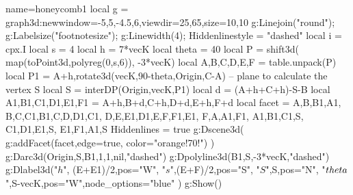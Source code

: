 \documentclass[12pt]{standalone}
\begin{document}
\begin{luadraw}{name=honeycomb1}
local g = graph3d:new{window={-5,5,-4.5,6},viewdir={25,65},size={10,10}}
g:Linejoin("round"); g:Labelsize("footnotesize"); g:Linewidth(4); Hiddenlinestyle = "dashed"
local i = cpx.I
local s = 4
local h = 7*vecK
local theta = 40
local P = shift3d( map(toPoint3d,polyreg(0,s,6)), -3*vecK)
local A,B,C,D,E,F = table.unpack(P)
local P1 = {A+h,rotate3d(vecK,90-theta,{Origin,C-A})} -- plane to calculate the vertex S
local S = interDP({Origin,vecK},P1)
local d = (A+h+C+h)-S-B
local A1,B1,C1,D1,E1,F1 = A+h,B+d,C+h,D+d,E+h,F+d
local facet = {{A,B,B1,A1}, {B,C,C1,B1},{C,D,D1,C1}, {D,E,E1,D1},{E,F,F1,E1}, {F,A,A1,F1}, {A1,B1,C1,S}, {C1,D1,E1,S}, {E1,F1,A1,S}}
Hiddenlines = true
g:Dscene3d(
  g:addFacet(facet,{edge=true, color="orange!70!"})
)
g:Darc3d(Origin,S,B1,1,1,nil,"dashed")
g:Dpolyline3d({B1,S,-3*vecK},"dashed")
g:Dlabel3d("$h$", (E+E1)/2,{pos="W"}, "$s$",(E+F)/2,{pos="S"}, "$S$",S,{pos="N"},
    "$\\theta$",S-vecK,{pos="W",node_options="blue"} )
g:Show()
\end{luadraw}
\end{document}
